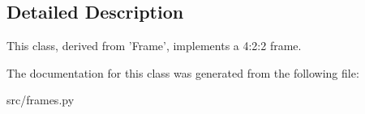 \subsection{Detailed Description}
\begin{DoxyVerb}This class, derived from 'Frame', implements a 4:2:2 frame.
\end{DoxyVerb}
 

The documentation for this class was generated from the following file\+:\begin{DoxyCompactItemize}
\item 
src/frames.\+py\end{DoxyCompactItemize}
